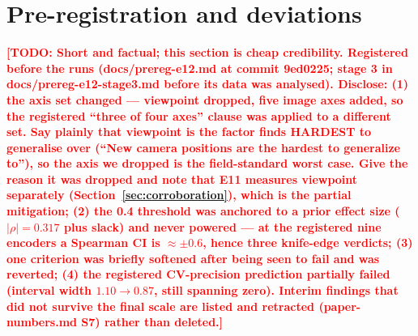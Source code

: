 \documentclass[10pt]{article}
\newcommand{\TODO}[1]{\textcolor{red}{\textbf{[TODO: #1]}}}
\newcommand{\rrho}{\rho}
\begin{document}
\section{Pre-registration and deviations}
\label{sec:prereg}
\TODO{Short and factual; this section is cheap credibility. Registered before
the runs (docs/prereg-e12.md at commit 9ed0225; stage 3 in
docs/prereg-e12-stage3.md before its data was analysed). Disclose:
(1) the axis set changed --- viewpoint dropped, five image axes added, so the
registered ``three of four axes'' clause was applied to a different set. Say
plainly that viewpoint is the factor \citet{xie2024factorworld} finds HARDEST
to generalise over (``New camera positions are the hardest to generalize to''),
so the axis we dropped is the field-standard worst case. Give the reason it
was dropped and note that E11 measures viewpoint separately (Section~\ref{sec:corroboration}), which is the partial mitigation;
(2) the 0.4 threshold was anchored to a prior effect size ($|\rrho|=0.317$
plus slack) and never powered --- at the registered nine encoders a Spearman
CI is ${\approx}\pm0.6$, hence three knife-edge verdicts; (3) one criterion
was briefly softened after being seen to fail and was reverted; (4) the
registered CV-precision prediction partially failed (interval width
$1.10 \to 0.87$, still spanning zero). Interim findings that did not survive
the final scale are listed and retracted (paper-numbers.md S7) rather than
deleted.}

\end{document}
